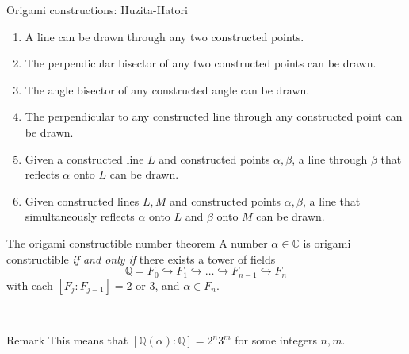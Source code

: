 \documentclass[handout]{beamer}
\def\C{\mathbb{C}}
\def\Q{\mathbb{Q}}
\begin{document}
    \begin{frame}{Origami constructions: Huzita-Hatori}
        \begin{enumerate}
            \item A line can be drawn through any two constructed points.
            \item The perpendicular bisector of any two constructed points can be
            drawn.
            \item The angle bisector of any constructed angle can be drawn.
            \item The perpendicular to any constructed line through any constructed
            point can be drawn.
            \item Given a constructed line $L$ and constructed points $\alpha,
            \beta$, a line through $\beta$ that reflects $\alpha$ onto $L$ can be
            drawn.
            \item \alert<2->{Given constructed lines $L, M$ and constructed points
            $\alpha, \beta$, a line that simultaneously reflects $\alpha$ onto $L$
            and $\beta$ onto $M$ can be drawn.}
        \end{enumerate}
    \end{frame}


    \begin{frame}{The origami constructible number theorem}
        A number $\alpha \in \C$ is origami constructible \emph{if and only if} there
        exists a tower of fields \[
            \Q = F_0 \hookrightarrow F_1 \hookrightarrow \dots \hookrightarrow F_{n -
            1} \hookrightarrow F_n
        \] with each $[F_j : F_{j - 1}] = 2$ or $3$, and $\alpha \in F_n$.

        ~\\\pause

        \begin{block}{Remark} \vspace{0.1em}
            This means that $[\Q(\alpha) : \Q] = 2^n3^m$ for some integers $n, m$.
        \end{block}
    \end{frame}
\end{document}
